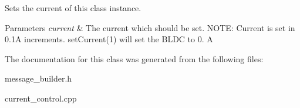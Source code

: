 Sets the current of this class instance. 
\begin{DoxyParams}{Parameters}
{\em current} & The current which should be set. N\+O\+TE\+: Current is set in 0.\+1A increments. set\+Current(1) will set the B\+L\+DC to 0. A \\
\hline
\end{DoxyParams}


The documentation for this class was generated from the following files\+:\begin{DoxyCompactItemize}
\item 
message\+\_\+builder.\+h\item 
current\+\_\+control.\+cpp\end{DoxyCompactItemize}
